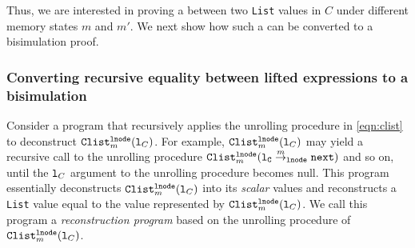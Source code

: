 Thus, we are interested in proving a \recursiveRelation{}
between two {\tt List} values in $C$ under different memory states $m$ and $m'$.
We next show
how such a \recursiveRelation{} can be converted to a bisimulation proof.



\subsubsection{Converting recursive equality between lifted expressions to
a bisimulation}
\label{sec:recursiveEqToBisim}
Consider a
program that recursively applies
the unrolling procedure in \cref{eqn:clist}
to deconstruct
${\tt Clist}_m^{{\tt lnode}}({\tt l}_C)$.
For example,
${\tt Clist}_m^{{\tt lnode}}({\tt l}_C)$
may yield a recursive call
to the unrolling procedure
${\tt Clist}_m^{{\tt lnode}}({\tt {\tt l}_C} \overset{m}{\rightarrow}_{\tt lnode} {\tt next})$
and so on, until the ${\tt l}_C$ argument to
the unrolling procedure becomes null.
This program essentially deconstructs ${\tt Clist}_m^{{\tt lnode}}({\tt l}_C)$
into its {\em scalar} values and reconstructs
a {\tt List} value equal to the value
represented by ${\tt Clist}_m^{{\tt lnode}}({\tt l}_C)$.
We call this program a {\em reconstruction program} based
on the unrolling procedure of
${\tt Clist}_m^{{\tt lnode}}({\tt l}_C)$.

